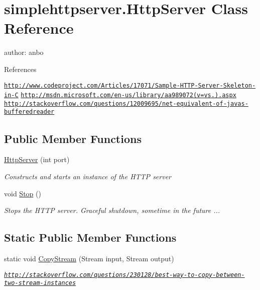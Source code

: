 \hypertarget{classsimplehttpserver_1_1_http_server}{\section{simplehttpserver.\-Http\-Server Class Reference}
\label{classsimplehttpserver_1_1_http_server}
}


author\-: anbo\par
 References 
\begin{DoxyItemize}
\end{DoxyItemize}\href{http://www.codeproject.com/Articles/17071/Sample-HTTP-Server-Skeleton-in-C}{\tt http\-://www.\-codeproject.\-com/\-Articles/17071/\-Sample-\/\-H\-T\-T\-P-\/\-Server-\/\-Skeleton-\/in-\/\-C} \href{http://msdn.microsoft.com/en-us/library/aa989072(v=vs.80).aspx}{\tt http\-://msdn.\-microsoft.\-com/en-\/us/library/aa989072(v=vs.).\-aspx} \href{http://stackoverflow.com/questions/12009695/net-equivalent-of-javas-bufferedreader}{\tt http\-://stackoverflow.\-com/questions/12009695/net-\/equivalent-\/of-\/javas-\/bufferedreader}  


\subsection*{Public Member Functions}
\begin{DoxyCompactItemize}
\item 
\hyperlink{classsimplehttpserver_1_1_http_server_a5daeea2f8f61dc6af0cdde155c670788}{Http\-Server} (int port)
\begin{DoxyCompactList}\small\item\em Constructs and starts an instance of the H\-T\-T\-P server \end{DoxyCompactList}\item 
void \hyperlink{classsimplehttpserver_1_1_http_server_a2958a64a6db1a0ef49e6c537f44563cd}{Stop} ()
\begin{DoxyCompactList}\small\item\em Stops the H\-T\-T\-P server. Graceful shutdown, sometime in the future ... \end{DoxyCompactList}\end{DoxyCompactItemize}
\subsection*{Static Public Member Functions}
\begin{DoxyCompactItemize}
\item 
static void \hyperlink{classsimplehttpserver_1_1_http_server_a255178221aebb2fce646f56c9d0fc184}{Copy\-Stream} (Stream input, Stream output)
\begin{DoxyCompactList}\small\item\em \href{http://stackoverflow.com/questions/230128/best-way-to-copy-between-two-stream-instances}{\tt http\-://stackoverflow.\-com/questions/230128/best-\/way-\/to-\/copy-\/between-\/two-\/stream-\/instances} \end{DoxyCompactList}\end{DoxyCompactItemize}
